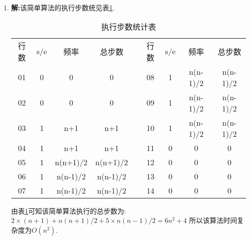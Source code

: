 \begin{solution}
\begin{enumerate}
\item \textbf{解:}该简单算法的执行步数统见表\ref{stepnum}.
\begin{table}[!htb]
\centering
\caption{\label{stepnum}执行步数统计表}
\begin{tabular}{|l|l|l|l|l|l|l|l|l|}
\cline{1-4}\cline{6-9}
\multicolumn{1}{|c|}{行数} & \multicolumn{1}{c|}{s/e} & \multicolumn{1}{c|}{频率} & \multicolumn{1}{c|}{总步数} & \multicolumn{1}{c|}{} & \multicolumn{1}{c|}{行数} & \multicolumn{1}{c|}{s/e} & \multicolumn{1}{c|}{频率} & \multicolumn{1}{c|}{总步数} \\
\cline{1-4}\cline{6-9}
\multicolumn{1}{|c|}{01} & \multicolumn{1}{c|}{0} & \multicolumn{1}{c|}{0} & \multicolumn{1}{c|}{0} & \multicolumn{1}{c|}{} & \multicolumn{1}{c|}{08} & \multicolumn{1}{c|}{1} & \multicolumn{1}{c|}{n(n-1)/2} & \multicolumn{1}{c|}{n(n-1)/2} \\
\multicolumn{1}{|c|}{02} & \multicolumn{1}{c|}{0} & \multicolumn{1}{c|}{0} & \multicolumn{1}{c|}{0} & \multicolumn{1}{c|}{} & \multicolumn{1}{c|}{09} & \multicolumn{1}{c|}{1} & \multicolumn{1}{c|}{n(n-1)/2} & \multicolumn{1}{c|}{n(n-1)/2} \\
\multicolumn{1}{|c|}{03} & \multicolumn{1}{c|}{1} & \multicolumn{1}{c|}{n+1} & \multicolumn{1}{c|}{n+1} & \multicolumn{1}{c|}{} & \multicolumn{1}{c|}{10} & \multicolumn{1}{c|}{1} & \multicolumn{1}{c|}{n(n-1)/2} & \multicolumn{1}{c|}{n(n-1)/2} \\
\multicolumn{1}{|c|}{04} & \multicolumn{1}{c|}{1} & \multicolumn{1}{c|}{n+1} & \multicolumn{1}{c|}{n+1} & \multicolumn{1}{c|}{} & \multicolumn{1}{c|}{11} & \multicolumn{1}{c|}{0} & \multicolumn{1}{c|}{0} & \multicolumn{1}{c|}{0} \\
\multicolumn{1}{|c|}{05} & \multicolumn{1}{c|}{1} & \multicolumn{1}{c|}{n(n+1)/2} & \multicolumn{1}{c|}{n(n+1)/2} & \multicolumn{1}{c|}{} & \multicolumn{1}{c|}{12} & \multicolumn{1}{c|}{0} & \multicolumn{1}{c|}{0} & \multicolumn{1}{c|}{0} \\
\multicolumn{1}{|c|}{06} & \multicolumn{1}{c|}{1} & \multicolumn{1}{c|}{n(n-1)/2} & \multicolumn{1}{c|}{n(n-1)/2} & \multicolumn{1}{c|}{} & \multicolumn{1}{c|}{13} & \multicolumn{1}{c|}{0} & \multicolumn{1}{c|}{0} & \multicolumn{1}{c|}{0} \\
\multicolumn{1}{|c|}{07} & \multicolumn{1}{c|}{1} & \multicolumn{1}{c|}{n(n-1)/2} & \multicolumn{1}{c|}{n(n-1)/2} & \multicolumn{1}{c|}{} & \multicolumn{1}{c|}{14} & \multicolumn{1}{c|}{0} & \multicolumn{1}{c|}{0} & \multicolumn{1}{c|}{0} \\
\cline{1-4}\cline{6-9}
\end{tabular}
\end{table}
由表\ref{stepnum}可知该简单算法执行的总步数为:
$2\times (n+1)+n(n+1)/2 + 5\times n(n-1)/2 = 6n^2+4$
 所以该算法时间复杂度为$O(n^2)$.


\end{enumerate}
\end{solution}
